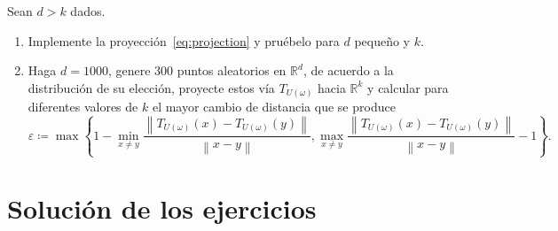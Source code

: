 \begin{enumerate}
	      Sean $d>k$ dados.
	      \begin{enumerate}
		      \item

		            Implemente la proyección~\eqref{eq:projection} y pruébelo para $d$ pequeño
		            y $k$.

		      \item

		            Haga $d=1000$, genere $300$ puntos aleatorios en
		            $\mathbb{R}^{d}$, de acuerdo a la distribución de su
		            elección, proyecte estos vía
		            $T_{U\left(\omega\right)}$ hacia
		            $\mathbb{R}^{k}$ y calcular para diferentes valores
		            de $k$ el mayor cambio de distancia que se produce
		            \begin{equation*}
			            \varepsilon\coloneqq%
			            \max\left\{
			            1-
			            \min_{x\neq y}
			            \frac{
				            \left\|
				            T_{U\left(\omega\right)}\left(x\right)-
				            T_{U\left(\omega\right)}\left(y\right)
				            \right\|
			            }{
				            \left\|
				            x-y
				            \right\|
			            },
			            \max_{x\neq y}
			            \frac{
				            \left\|
				            T_{U\left(\omega\right)}\left(x\right)-
				            T_{U\left(\omega\right)}\left(y\right)
				            \right\|
			            }{
				            \left\|
				            x-y
				            \right\|
			            }-
			            1
			            \right\}.
		            \end{equation*}
	      \end{enumerate}
\end{enumerate}

\section{Solución de los ejercicios}

